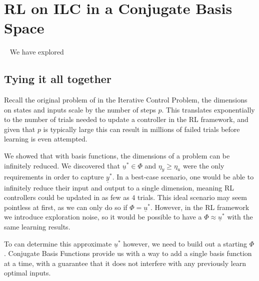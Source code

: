 
\FloatBarrier\section{RL on ILC in a Conjugate Basis Space}
~\label{sec:rl_on_conjugate_basis_ilc}
We have explored

\FloatBarrier\subsection{Tying it all together}
Recall the original problem of in the Iterative Control Problem, the dimensions on states and inputs scale by the number of steps $p$. This translates exponentially to the number of trials needed to update a controller in the \ac{RL} framework, and given that $p$ is typically large this can result in millions of failed trials before learning is even attempted.

We showed that with basis functions, the dimensions of a problem can be infinitely reduced. We discovered that $\underline{u}^\ast \in \Phi$ and $\eta_y \geq \eta_u$ were the only requirements in order to capture $\underline{y}^\ast$. In a best-case scenario, one would be able to infinitely reduce their input and output to a single dimension, meaning RL controllers could be updated in as few as $4$ trials. This ideal scenario may seem pointless at first, as we can only do so if $\Phi = \underline{u}^\ast$. However, in the RL framework we introduce exploration noise, so it would be possible to have a $\Phi \approx \underline{u}^\ast$ with the same learning results.

To can determine this approximate $\underline{u}^\ast$ however, we need to build out a starting $\Phi$. Conjugate Basis Functions provide us with a way to add a single basis function at a time, with a guarantee that it does not interfere with any previously learn optimal inputs. 

